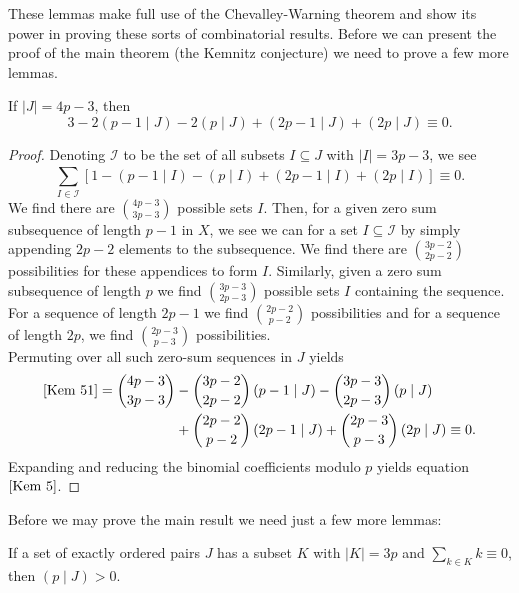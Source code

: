 These lemmas make full use of the Chevalley-Warning theorem and show its power in proving these sorts of combinatorial results. Before we can present the proof of the main theorem (the Kemnitz conjecture) we need to prove a few more lemmas.
\begin{lemma}\label{KemLem5}
	If \(\left| J \right| = 4p-3\), then
	\begin{equation}
		3 - 2\left( p-1 \mid J \right)  - 2\left( p \mid J  \right) + \left( 2p-1 \mid J \right)  + \left( 2p \mid J \right) \equiv 0. \label{Kem 51}
	\end{equation}
\end{lemma}
\begin{proof}
	Denoting \(\mathscr{I}\) to be the set of all subsets \(I \subseteq J\) with \(\left| I \right|  = 3p-3\), we see \begin{equation}
		\sum_{I \in \mathscr{I}}^{} \left[ 1 - \left( p-1 \mid I \right)  - \left( p \mid I \right)  + \left( 2p-1 \mid I \right)  + \left( 2p \mid I \right)  \right] \equiv 0\label{Kem 51}
	.\end{equation}
	We find there are \(\binom{4p-3}{3p-3}\) possible sets \(I\). Then, for a given zero sum subsequence of length \(p-1\) in \(X\), we see we can for a set \(I \subseteq \mathscr{I}\) by simply appending \(2p-2\) elements to the subsequence. We find there are \(\binom{3p-2}{2p-2}\) possibilities for these appendices to form \(I\). Similarly, given a zero sum subsequence of length \(p\) we find \(\binom{3p-3}{2p-3}\) possible sets \(I\) containing the sequence. For a sequence of length \(2p-1\) we find \(\binom{2p-2}{p-2}\) possibilities and for a sequence of length \(2p\), we find \(\binom{2p-3}{p-3}\) possibilities.\\
	Permuting over all such zero-sum sequences in \(J\) yields \begin{align*}
		\eqref{Kem 51} = \binom{4p-3}{3p-3} &- \binom{3p-2}{2p-2}\left( p-1 \mid J \right)  - \binom{3p-3}{2p-3}\left( p \mid J \right)  \\
		&+ \binom{2p-2}{p-2}\left( 2p-1 \mid J \right)  + \binom{2p-3}{p-3} \left( 2p \mid J \right) \equiv 0
	.\end{align*}
	Expanding and reducing the binomial coefficients modulo \(p\) yields equation \(\refeq{Kem 5}\).
\end{proof}
Before we may prove the main result we need just a few more lemmas:
\begin{lemma}\label{KemLem3}
	If a set of exactly ordered pairs \(J\) has a subset \(K\) with \(\left| K \right|  = 3p\) and \(\sum_{k \in K}^{} k \equiv 0\), then \(\left( p \mid J \right) > 0\).
\end{lemma}
